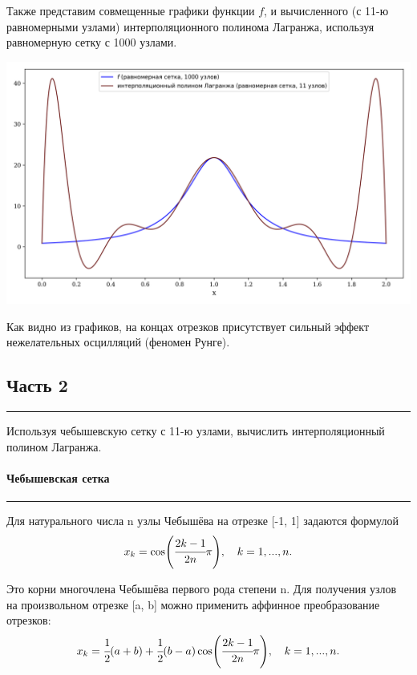 \documentclass[a4paper, 14pt]{extarticle}
\begin{document}
\newpage

Также представим совмещенные графики функции $f$, и 
вычисленного (с 11-ю равномерными узлами) интерполяционного полинома Лагранжа, 
используя равномерную сетку с 1000 узлами.

\begin{center}
  \includegraphics[width=1\textwidth]{uniformXref1000}
\end{center}

Как видно из графиков, на концах отрезков присутствует сильный 
эффект нежелательных осцилляций (феномен Рунге).

\subsection*{Часть 2}\vspace{-20pt}\rule{\linewidth}{0.1mm}

Используя чебышевскую сетку с 11-ю узлами, вычислить интерполяционный полином
Лагранжа.

\paragraph*{Чебышевская сетка}\vspace{-20pt}\rule{\linewidth}{0.1mm}

Для натурального числа n узлы Чебышёва на отрезке [-1, 1] задаются формулой 
\begin{equation*}
  x_k = \cos(\cfrac{2k - 1}{2n} \pi), \quad k=1,...,n.
\end{equation*}

Это корни многочлена Чебышёва первого рода степени n. 
Для получения узлов на произвольном отрезке [a, b] можно применить аффинное 
преобразование отрезков: 
\begin{equation*}
  x_k = \cfrac{1}{2} (a+b) + \cfrac{1}{2} (b-a) \cos(\cfrac{2k-1}{2n}\pi), \quad k=1,...,n.
\end{equation*}
\end{document}
